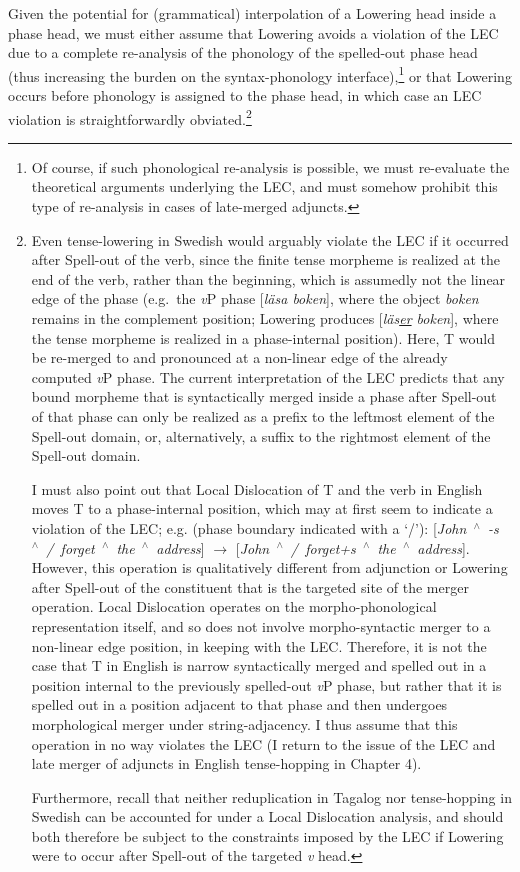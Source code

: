 Given the potential for (grammatical) interpolation of a Lowering head inside a phase head, we must either assume that Lowering avoids a violation of the LEC due to a complete re-analysis of the phonology of the spelled-out phase head (thus increasing the burden on the syntax-phonology interface),\footnote{Of course, if such phonological re-analysis is possible, we must re-evaluate the theoretical arguments underlying the LEC, and must somehow prohibit this type of re-analysis in cases of late-merged adjuncts.} or that Lowering occurs before phonology is assigned to the phase head, in which case an LEC violation is straightforwardly obviated.\footnote{\label{tense_hopping_LEC_fn}Even tense-lowering in Swedish would arguably violate the LEC if it occurred after Spell-out of the verb, since the finite tense morpheme is realized at the end of the verb, rather than the beginning, which is assumedly not the linear edge of the phase (e.g.\ the {\it v}P phase [{\it l\"{a}sa boken}], where the object {\it boken} remains in the complement position; Lowering produces [\textit{l\"{a}s\underline{er} boken}], where the tense morpheme is realized in a phase-internal position). Here, T would be re-merged to and pronounced at a non-linear edge of the already computed {\it v}P phase. The current interpretation of the LEC predicts that any bound morpheme that is syntactically merged inside a phase after Spell-out of that phase can only be realized as a prefix to the leftmost element of the Spell-out domain, or, alternatively, a suffix to the rightmost element of the Spell-out domain.

\nobreak
I must also point out that Local Dislocation of T and the verb in English moves T to a phase-internal position, which may at first seem to indicate a violation of the LEC; e.g. (phase boundary indicated with a `/'): [\textit{John~$^{\wedge}$~-s~$^{\wedge}$~/~forget~$^{\wedge}$~the~$^{\wedge}$~address}] $\rightarrow$ [\textit{John~$^{\wedge}$~/~forget+s~$^{\wedge}$~the~$^{\wedge}$~address}]. However, this operation is qualitatively different from adjunction or Lowering after Spell-out of the constituent that is the targeted site of the merger operation. Local Dislocation operates on the morpho-phonological representation itself, and so does not involve morpho-syntactic merger to a non-linear edge position, in keeping with the LEC. Therefore, it is not the case that T in English is narrow syntactically merged and spelled out in a position internal to the previously spelled-out {\it v}P phase, but rather that it is spelled out in a position adjacent to that phase and then undergoes morphological merger under string-adjacency. I thus assume that this operation in no way violates the LEC (I return to the issue of the LEC and late merger of adjuncts in English tense-hopping in Chapter 4).

Furthermore, recall that neither reduplication in Tagalog nor tense-hopping in Swedish can be accounted for under a Local Dislocation analysis, and should both therefore be subject to the constraints imposed by the LEC if Lowering were to occur after Spell-out of the targeted {\it v} head.}

